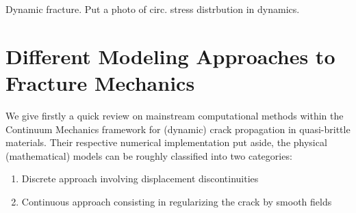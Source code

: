 Dynamic fracture. Put a photo of circ. stress distrbution in dynamics.

\section{Different Modeling Approaches to Fracture Mechanics}  \label{sec:models}
We give firstly a quick review on mainstream computational methods within the Continuum Mechanics framework for (dynamic) crack propagation in quasi-brittle materials. Their respective numerical implementation put aside, the physical (mathematical) models can be roughly classified into two categories:
\begin{enumerate}
\item Discrete approach involving displacement discontinuities
\item Continuous approach consisting in regularizing the crack by smooth fields
\end{enumerate}

